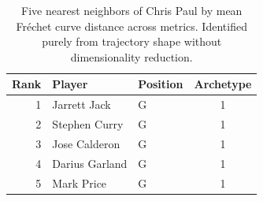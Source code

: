\begin{table}[htbp]
  \centering\small
  \begin{tabular}{rllc}
    \toprule
    Rank & Player & Position & Archetype \\
    \midrule
    1 & Jarrett Jack & G & 1 \\
    2 & Stephen Curry & G & 1 \\
    3 & Jose Calderon & G & 1 \\
    4 & Darius Garland & G & 1 \\
    5 & Mark Price & G & 1 \\
    \bottomrule
  \end{tabular}
  \caption{Five nearest neighbors of Chris Paul by mean Fr\'{e}chet curve distance across metrics. Identified purely from trajectory shape without dimensionality reduction.}
  \label{tab:Chris_Paul_frechet_curve_neighbors}
\end{table}

